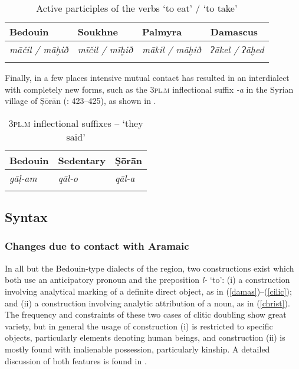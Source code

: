\documentclass[output=paper]{langsci/langscibook}
\begin{document}
\begin{table}
\begin{tabularx}{.8\textwidth}{lllX}
\lsptoprule
 Bedouin &   Soukhne &  Palmyra &  Damascus\\
 \midrule 
\textit{māčil / māḫið} & \textit{mīčil / mīḫið} & \textit{mākil / māḫið} & \textit{ʔākel / ʔāḫed}\\
\lspbottomrule
\end{tabularx}
\caption{Active participles of the verbs ‘to eat’ / ‘to take’}
\label{tab:prochazka:3}
\end{table}

Finally, in a few places intensive mutual contact has resulted in an interdialect \citep[62]{Trudgill1986} with completely new forms, such as the 3\textsc{pl.m} inflectional suffix \textit{-a} in the Syrian village of Ṣōrān (\citealt{Behnstedt1994Dialektkontakt}: 423--425), as shown in .

\begin{table}
\begin{tabularx}{.8\textwidth}{XXl}
\lsptoprule
 Bedouin &  Sedentary &  Ṣōrān\\
\midrule 
\textit{gāḷ-am} & \textit{qāl-o} & \textit{qāl-a}\\
\lspbottomrule
\end{tabularx}
\caption{3\textsc{pl.m} inflectional suffixes -- `they said'}  
\label{tab:prochazka:4}
\end{table}

  \subsection{Syntax}
  \subsubsection{Changes due to contact with Aramaic}

In all but the Bedouin-type dialects of the region, two constructions exist which both use an anticipatory pronoun and the preposition \textit{l-} ‘to’: (i) a construction involving analytical marking of a definite direct object, as in (\ref{damas})--(\ref{cilic}); and (ii) a construction involving analytic attribution of a noun, as in (\ref{christ}). The frequency and constraints of these two cases of clitic doubling show great variety, but in general the usage of construction (i) is restricted to specific objects, particularly elements denoting human beings, and construction (ii) is mostly found with inalienable possession, particularly kinship. A detailed discussion of both features is found in \citet{Souag2017clitic}.
\end{document}
